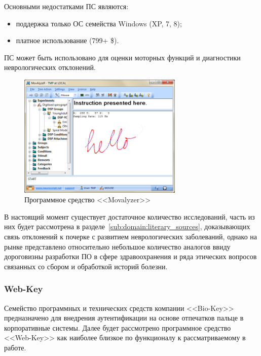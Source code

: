 Основными недостатками ПС являются:
\begin{itemize}
  \item поддержка только ОС семейства Windows (XP, 7, 8);
  \item платное использование (799+ \$).
\end{itemize}

ПС может быть использовано для оценки моторных функций и диагностики неврологических отклонений.

\begin{figure}[ht]
    \centering
    \includegraphics[width=0.7\textwidth]{figures/movalyzer.png}
    \caption{Программное средство <<Movalyzer>>}
    \label{fig:domain:analogs:movalyzer}
\end{figure}

В настоящий момент существует достаточное количество исследований, часть из них будет рассмотрена в разделе~\ref{sub:domain:literary_sources}, доказывающих связь отклонений к почерке с развитием неврологических заболеваний, однако на рынке представлено относительно небольшое количество аналогов ввиду дороговизны разработки ПО в сфере здравоохранения и ряда этических вопросов связанных со сбором и обработкой историй болезни.

\subsubsection{Web-Key}
\label{sub:domain:analogs:biokey}
Семейство программных и технических средств компании <<Bio-Key>>~\cite{analogs_biokey} предназначено для внедрения аутентификации на основе отпечатков пальце в корпоративные системы. Далее будет рассмотрено программное средство <<Web-Key>> как наиболее близкое по функционалу к рассматриваемому в работе.

